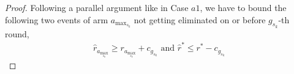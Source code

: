 \begin{proof}
%
%
%
%  
%   
% 
% 
%

Following a parallel argument like in Case $a1$, we have to bound the following two events of arm $a_{\max_{s_{k}}}$ not getting eliminated on or before $g_{s_{k}}$-th round,
\begin{align*}
  \hat{r}_{a_{\max_{s_{k}}}} \geq r_{a_{\max_{s_{k}}}} +c_{g_{s_{k}}} \text{ and } \hat{r}^{*} \leq r^{*} -c_{g_{s_{k}}}
\end{align*} 


\end{proof}
